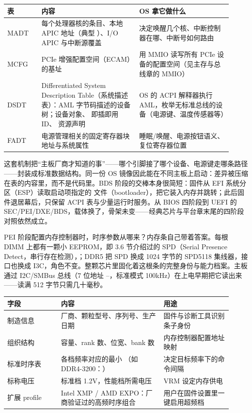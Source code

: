 \begin{longtable}{L{0.14\linewidth}L{0.40\linewidth}L{0.38\linewidth}}
\toprule
表 & 内容 & OS 拿它做什么 \\
\midrule
MADT & 每个处理器核的条目、本地 APIC 地址（典型 ）、I/O APIC 与中断源覆盖 & 决定唤醒几个核、中断控制器在哪、中断号如何路由 \\
MCFG & PCIe 增强配置空间（ECAM）的基址 & 用 MMIO 读写所有 PCIe 设备的配置空间（见主存与总线章的 MMIO） \\
DSDT & Differentiated System Description Table（系统描述表）：AML 字节码描述的设备树；设备对象、 即插即用 ID、 资源声明 & OS 的 ACPI 解释器执行 AML，枚举无标准总线的设备（电源键、温度传感器等） \\
FADT & 电源管理相关的固定寄存器块地址与系统属性 & 睡眠/唤醒、电源按钮语义、复位寄存器位置 \\
\bottomrule
\end{longtable}

这套机制把“主板厂商才知道的事”——哪个引脚接了哪个设备、电源键走哪条路径——封装成标准数据结构。同一份 OS 镜像因此能在不同主板上启动：差异被压缩在表的内容里，而不是代码里。BDS 阶段的交棒本身很简短：固件从 EFI 系统分区（ESP）读取启动项指定的  文件（bootloader），把它装入内存并跳转；此后固件退居幕后，只保留 ACPI 表与少量运行时服务。从 BIOS 四阶段到 UEFI 的 SEC/PEI/DXE/BDS，载体换了，骨架未变——经典芯片与平台章末尾的四阶段对照依然成立。


PEI 阶段配置内存控制器时，时序参数从哪来？内存条自己带着答案。每根 DIMM 上都有一颗小 EEPROM，即 3.6 节介绍过的 SPD（Serial Presence Detect，串行存在检测），；DDR5 把 SPD 换成 1024 字节的 SPD5118 集线器，接口也换成 I3C，角色不变。整颗芯片里固化着这根条的完整身份与能力档案。主板通过 I2C/SMBus 总线（7 位地址 --，标准模式 100kHz）在上电早期把它读出来——读满 512 字节只需几十毫秒。

\begin{longtable}{L{0.22\linewidth}L{0.42\linewidth}L{0.28\linewidth}}
\toprule
字段 & 内容 & 用途 \\
\midrule
制造信息 & 厂商、颗粒型号、序列号、生产日期 & 固件与诊断工具识别条子身份 \\
组织结构 & 容量、rank 数、位宽、bank 数 & 内存控制器配置地址映射 \\
标准时序表 & 各档频率对应的最小 （如 DDR4-3200：） & 决定目标频率下的命令间隔 \\
标称电压 & 标准档 1.2V，性能档所需电压 & VRM 设定内存供电 \\
扩展 profile & Intel XMP / AMD EXPO：厂商验证过的高频时序组合 & 用户在固件设置里一键启用超频档 \\
\bottomrule
\end{longtable}

